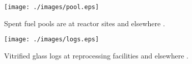 

  \begin{figure}[htbp!]
    \begin{center}
    \begin{minipage}[t]{0.45\textwidth}
      \texttt{[image: ./images/pool.eps]}
      \caption{Spent fuel pools are at reactor sites and elsewhere 
        \cite{doe_spent_????}.}
        \label{fig:pool}
    \end{minipage}
    \hspace{0.01\textwidth}
    \begin{minipage}[t]{0.45\textwidth}
      \texttt{[image: ./images/logs.eps]}
        \caption{Vitrified glass logs at reprocessing facilities and elsewhere 
          \cite{essick_photographing_2012}.}
        \label{fig:logs}
    \end{minipage}
    \end{center}
  \end{figure}
